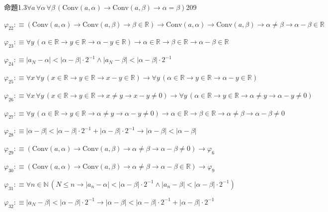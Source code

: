 \begin{fullproof}{命題1.3}{$\forall a\,\forall \alpha\,\forall \beta\,(\mathrm{Conv}(a,\alpha) \to \mathrm{Conv}(a,\beta) \to \alpha = \beta)$}{209}
\begin{abbrevlist}
\item $\varphi_{22} :\equiv (\mathrm{Conv}(a,\alpha) \to \mathrm{Conv}(a,\beta) \to \beta \in \mathbb{R}) \to \mathrm{Conv}(a,\alpha) \to \mathrm{Conv}(a,\beta) \to \alpha \neq \beta \to \alpha - \beta \in \mathbb{R}$
\item $\varphi_{23} :\equiv \forall y\,(\alpha \in \mathbb{R} \to y \in \mathbb{R} \to \alpha - y \in \mathbb{R}) \to \alpha \in \mathbb{R} \to \beta \in \mathbb{R} \to \alpha - \beta \in \mathbb{R}$
\item $\varphi_{24} :\equiv \lvert a_{N} - \alpha \rvert < \lvert \alpha - \beta \rvert \cdot 2^{-1} \land \lvert a_{N} - \beta \rvert < \lvert \alpha - \beta \rvert \cdot 2^{-1}$
\item $\varphi_{25} :\equiv \forall x\,\forall y\,(x \in \mathbb{R} \to y \in \mathbb{R} \to x - y \in \mathbb{R}) \to \forall y\,(\alpha \in \mathbb{R} \to y \in \mathbb{R} \to \alpha - y \in \mathbb{R})$
\item $\varphi_{26} :\equiv \forall x\,\forall y\,(x \in \mathbb{R} \to y \in \mathbb{R} \to x \neq y \to x - y \neq 0) \to \forall y\,(\alpha \in \mathbb{R} \to y \in \mathbb{R} \to \alpha \neq y \to \alpha - y \neq 0)$
\item $\varphi_{27} :\equiv \forall y\,(\alpha \in \mathbb{R} \to y \in \mathbb{R} \to \alpha \neq y \to \alpha - y \neq 0) \to \alpha \in \mathbb{R} \to \beta \in \mathbb{R} \to \alpha \neq \beta \to \alpha - \beta \neq 0$
\item $\varphi_{28} :\equiv \lvert \alpha - \beta \rvert < \lvert \alpha - \beta \rvert \cdot 2^{-1} + \lvert \alpha - \beta \rvert \cdot 2^{-1} \to \lvert \alpha - \beta \rvert < \lvert \alpha - \beta \rvert$
\item $\varphi_{29} :\equiv (\mathrm{Conv}(a,\alpha) \to \mathrm{Conv}(a,\beta) \to \alpha \neq \beta \to \alpha - \beta \neq 0) \to \varphi_{6}$
\item $\varphi_{30} :\equiv (\mathrm{Conv}(a,\alpha) \to \mathrm{Conv}(a,\beta) \to \alpha \neq \beta \to \alpha - \beta \in \mathbb{R}) \to \varphi_{9}$
\item $\varphi_{31} :\equiv \forall n \in \mathbb{N}\,(N \leq n \to \lvert a_{n} - \alpha \rvert < \lvert \alpha - \beta \rvert \cdot 2^{-1} \land \lvert a_{n} - \beta \rvert < \lvert \alpha - \beta \rvert \cdot 2^{-1})$
\item $\varphi_{32} :\equiv \lvert a_{N} - \beta \rvert < \lvert \alpha - \beta \rvert \cdot 2^{-1} \to \lvert \alpha - \beta \rvert < \lvert \alpha - \beta \rvert \cdot 2^{-1} + \lvert \alpha - \beta \rvert \cdot 2^{-1}$

\end{abbrevlist}
\end{fullproof}
